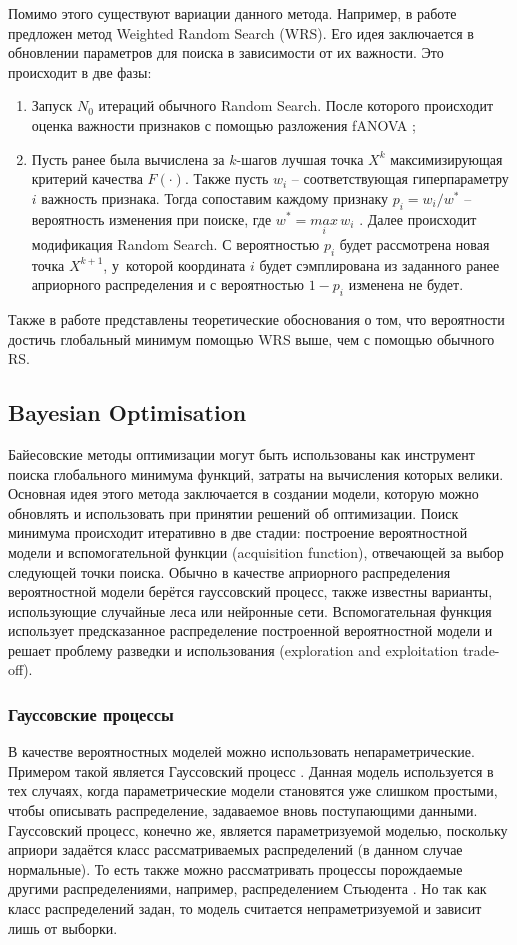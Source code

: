 \documentclass[12pt,fleqn]{article}
\begin{document}
Помимо этого существуют вариации данного метода. Например, в работе \cite{florea2020weighted} предложен метод Weighted Random Search (WRS). Его идея заключается в обновлении параметров для поиска в зависимости от их важности. Это происходит в две фазы:
\begin{enumerate}
    \item Запуск $N_0$ итераций обычного Random Search. После которого происходит оценка важности признаков с помощью разложения fANOVA \cite{HutHooLey14};
    \item Пусть ранее была вычислена за $k$-шагов лучшая точка $X^k$ максимизирующая критерий качества $F(\cdot)$. Также пусть $w_i$ -- соответствующая гиперпараметру $i$ важность признака. Тогда сопоставим каждому признаку $p_i = w_i / w^{*}$ -- вероятность изменения при поиске, где  $w^{*} = \underset{i}{max}\, w_i$ . Далее происходит модификация Random Search. С вероятностью $p_i$ будет рассмотрена новая точка $X^{k+1}$, у~которой координата $i$ будет сэмплирована из заданного ранее априорного распределения и с вероятностью $1 - p_i$ изменена не будет.
\end{enumerate}
Также в работе представлены теоретические обоснования о том, что вероятности достичь глобальный минимум помощью WRS выше, чем с помощью обычного RS. 


\subsection{Bayesian Optimisation}

Байесовские методы оптимизации могут быть использованы как инструмент поиска глобального минимума функций, затраты на вычисления которых велики. Основная идея этого метода заключается в создании модели, которую можно обновлять и использовать при принятии решений об оптимизации. Поиск минимума происходит итеративно в две стадии: построение вероятностной модели и вспомогательной функции (acquisition function), отвечающей за выбор следующей точки поиска. Обычно в качестве априорного распределения вероятностной модели берётся гауссовский процесс, также известны варианты, использующие случайные леса или нейронные сети. Вспомогательная функция использует предсказанное распределение построенной вероятностной модели и решает проблему разведки и использования (exploration and exploitation trade-off).


\subsubsection{Гауссовские процессы}
В качестве вероятностных моделей можно использовать непараметрические. Примером такой является Гауссовский процесс \cite{Rasmussen2006Gaussian}. Данная модель используется в тех случаях, когда параметрические модели становятся уже слишком простыми, чтобы описывать распределение, задаваемое вновь поступающими данными. Гауссовский процесс, конечно же, является параметризуемой моделью, поскольку априори задаётся класс рассматриваемых распределений (в данном случае нормальные). То есть также можно рассматривать процессы порождаемые другими распределениями, например, распределением Стьюдента \cite{shah2014student}. Но так как класс распределений задан, то модель считается непраметризуемой и зависит лишь от выборки.
\end{document}
